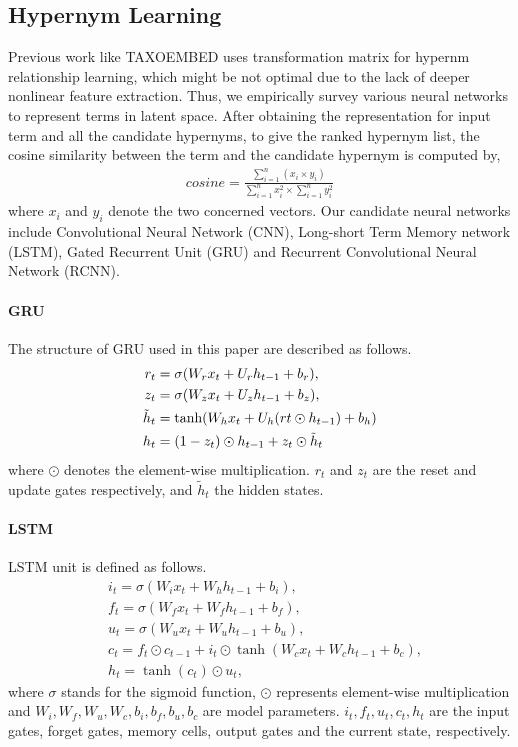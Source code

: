 \documentclass[11pt,a4paper]{article}
\begin{document}
	\subsection{Hypernym Learning}
	Previous work like TAXOEMBED \cite{Espinosa2016Supervised} uses transformation matrix for hypernm relationship learning, which might be not optimal due to the lack of deeper nonlinear feature extraction. Thus, we empirically survey various neural networks to represent terms in latent space. After obtaining the representation for input term and all the candidate hypernyms, to give the ranked hypernym list, the cosine similarity between the term and the candidate hypernym is computed by,
	\begin{align*}
	cosine = \frac{\sum_{i=1}^{n}(x_{i}\times y_{i})}{\sum_{i=1}^{n}x_{i}^{2} \times  \sum_{i=1}^{n}y_{i}^{2}}
	\end{align*} 
	where $x_{i}$ and $y_{i}$ denote the two concerned vectors.
	Our candidate neural networks include Convolutional Neural Network (CNN), Long-short Term Memory network (LSTM), Gated Recurrent Unit (GRU) and Recurrent Convolutional Neural Network (RCNN).
	
	\paragraph{GRU} The structure of GRU \cite{Cho2014Learning} used in this paper are described as follows.
	\begin{align*}
		r_{t} &=\sigma (W_{r}x_{t}+U_{r}h_{t-1}+b_{r}), \\
		z_{t} &=\sigma (W_{z}x_{t}+U_{z}h_{t-1}+b_{z}), \\
		\tilde{h}_{t} &=\textup{tanh}(W_{h}x_{t}+U_{h}(r{t}\odot h_{t-1})+b_{h}) \\
		h_{t} & = (1-z_{t})\odot h_{t-1}+z_{t}\odot \tilde{h}_{t}
	\end{align*}
	where $\odot$ denotes the element-wise multiplication. $r_{t}$ and $z_{t}$ are the reset and update gates respectively, and $\tilde{h}_{t}$ the hidden states. 
	
	\paragraph{LSTM}
	LSTM \cite{Hochreiter1997Long} unit is defined as follows.
	\begin{align*}
	&i_{t}=\sigma (W_{i}{x}_{t}+{W}_{h}{h}_{t-1}+{b}_{i}),\\
	&{f_{t}}=\sigma ({W}_{f}{x}_{t}+{W}_{f}{h}_{t-1}+{b}_{f}),\\
	&{u_{t}}=\sigma ({W}_{u}{x}_{t}+{W}_{u}{h}_{t-1}+{b}_{u}),\\
	&{c_{t}}={f}_{t}\odot {c}_{t-1}+{i}_{t}\odot\tanh({W}_{c}{x}_{t}+{W}_{c}{h}_{t-1}+{b}_{c}),\\
	&{h_{t}}=\tanh ({c}_{t})\odot {u}_{t},
	\end{align*}
	where $\sigma$ stands for the sigmoid function, $\odot$ represents element-wise multiplication and $W_{i}, W_{f}, W_{u}, {W}_{c}, {b}_{i}, {b}_{f}, {b}_{u}, {b}_{c}$ are model parameters. ${i_{t}},{f_{t}},{u_{t}},{c_{t}},{h_{t}}$ are the input gates, forget gates, memory cells, output gates and the current state, 
	respectively. 
	
\end{document}
